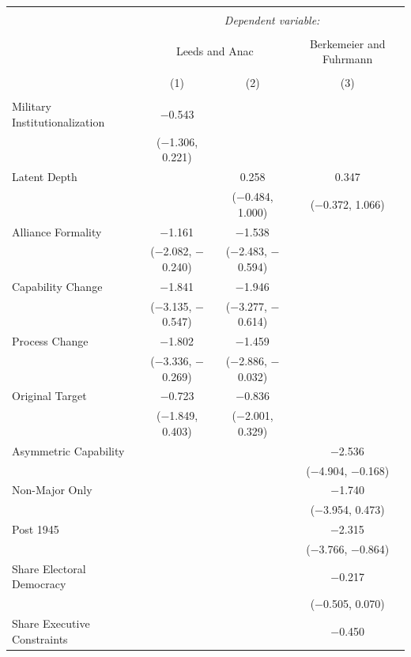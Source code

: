 \documentclass[12pt]{article}
\begin{document}
\begin{table}[!htbp] \centering 
  \caption{} 
  \label{tab:depth-performance} 
\begin{adjustbox}{width= .95\textwidth, center}
\begin{tabular}{@{\extracolsep{5pt}}lccc} 
\\[-1.8ex]\hline 
\hline \\[-1.8ex] 
 & \multicolumn{3}{c}{\textit{Dependent variable:}} \\ 
\cline{2-4} 
\\[-1.8ex] & \multicolumn{2}{c}{Leeds and Anac} & Berkemeier and Fuhrmann \\ 
\\[-1.8ex] & (1) & (2) & (3)\\ 
\hline \\[-1.8ex] 
 Military Institutionalization & $-$0.543 &  &  \\ 
  & ($-$1.306, 0.221) &  &  \\ 
  Latent Depth &  & 0.258 & 0.347 \\ 
  &  & ($-$0.484, 1.000) & ($-$0.372, 1.066) \\ 
  Alliance Formality & $-$1.161$^{}$ & $-$1.538$^{}$ &  \\ 
  & ($-$2.082, $-$0.240) & ($-$2.483, $-$0.594) &  \\ 
  Capability Change & $-$1.841$^{}$ & $-$1.946$^{}$ &  \\ 
  & ($-$3.135, $-$0.547) & ($-$3.277, $-$0.614) &  \\ 
  Process Change & $-$1.802$^{}$ & $-$1.459$^{}$ &  \\ 
  & ($-$3.336, $-$0.269) & ($-$2.886, $-$0.032) &  \\ 
  Original Target & $-$0.723 & $-$0.836 &  \\ 
  & ($-$1.849, 0.403) & ($-$2.001, 0.329) &  \\ 
  Asymmetric Capability &  &  & $-$2.536$^{}$ \\ 
  &  &  & ($-$4.904, $-$0.168) \\ 
  Non-Major Only &  &  & $-$1.740 \\ 
  &  &  & ($-$3.954, 0.473) \\ 
  Post 1945 &  &  & $-$2.315$^{}$ \\ 
  &  &  & ($-$3.766, $-$0.864) \\ 
  Share Electoral Democracy &  &  & $-$0.217 \\ 
  &  &  & ($-$0.505, 0.070) \\ 
  Share Executive Constraints &  &  & $-$0.450 \\ 

\end{tabular}
\end{adjustbox}
\end{table}
\end{document}
